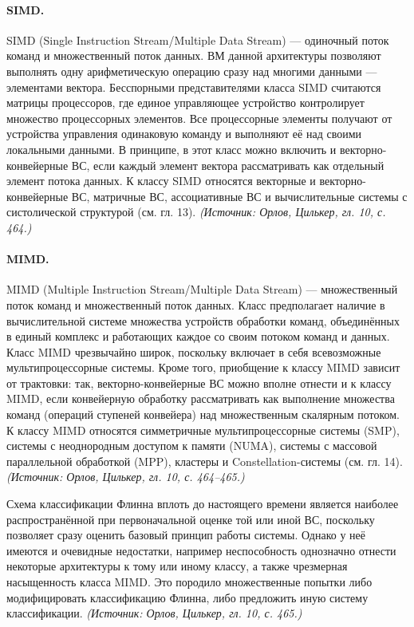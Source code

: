 \documentclass[a4paper,12pt]{article}
\begin{document}
\paragraph{SIMD.}
SIMD (Single Instruction Stream/Multiple Data Stream) — одиночный поток команд и множественный поток данных. ВМ данной архитектуры позволяют выполнять одну арифметическую операцию сразу над многими данными — элементами вектора. Бесспорными представителями класса SIMD считаются матрицы процессоров, где единое управляющее устройство контролирует множество процессорных элементов. Все процессорные элементы получают от устройства управления одинаковую команду и выполняют её над своими локальными данными. В принципе, в этот класс можно включить и векторно-конвейерные ВС, если каждый элемент вектора рассматривать как отдельный элемент потока данных. К классу SIMD относятся векторные и векторно-конвейерные ВС, матричные ВС, ассоциативные ВС и вычислительные системы с систолической структурой (см. гл. 13).
\textit{(Источник: Орлов, Цилькер, гл. 10, с. 464.)}

\paragraph{MIMD.}
MIMD (Multiple Instruction Stream/Multiple Data Stream) — множественный поток команд и множественный поток данных. Класс предполагает наличие в вычислительной системе множества устройств обработки команд, объединённых в единый комплекс и работающих каждое со своим потоком команд и данных. Класс MIMD чрезвычайно широк, поскольку включает в себя всевозможные мультипроцессорные системы. Кроме того, приобщение к классу MIMD зависит от трактовки: так, векторно-конвейерные ВС можно вполне отнести и к классу MIMD, если конвейерную обработку рассматривать как выполнение множества команд (операций ступеней конвейера) над множественным скалярным потоком. К классу MIMD относятся симметричные мультипроцессорные системы (SMP), системы с неоднородным доступом к памяти (NUMA), системы с массовой параллельной обработкой (MPP), кластеры и Constellation-системы (см. гл. 14).
\textit{(Источник: Орлов, Цилькер, гл. 10, с. 464--465.)}

Схема классификации Флинна вплоть до настоящего времени является наиболее распространённой при первоначальной оценке той или иной ВС, поскольку позволяет сразу оценить базовый принцип работы системы. Однако у неё имеются и очевидные недостатки, например неспособность однозначно отнести некоторые архитектуры к тому или иному классу, а также чрезмерная насыщенность класса MIMD. Это породило множественные попытки либо модифицировать классификацию Флинна, либо предложить иную систему классификации.
\textit{(Источник: Орлов, Цилькер, гл. 10, с. 465.)}
\end{document}
